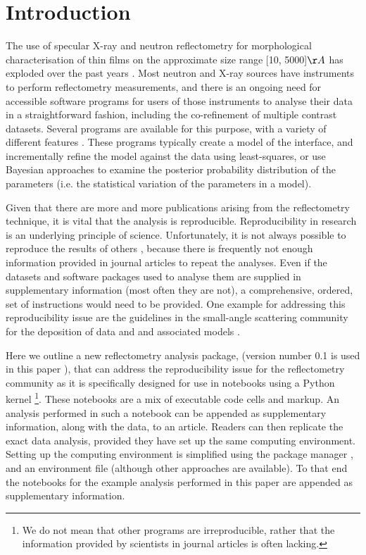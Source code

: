 \documentclass[12pt]{article}
\begin{document}
\section*{Introduction}
The use of specular X-ray and neutron reflectometry for morphological characterisation of thin films on the approximate size range [10, 5000]$\AA$ has exploded over the past years \cite{Wood2017, Daillant2009}. Most neutron and X-ray sources have instruments to perform reflectometry measurements, and there is an ongoing need for accessible software programs for users of those instruments to analyse their data in a straightforward fashion, including the co-refinement of multiple contrast datasets.  Several programs are available for this purpose, with a variety of different features \cite{Bjorck2007, Gerelli2016, Kienzle2011, Nelson2006}. These programs typically create a model of the interface, and incrementally refine the model against the data using least-squares, or use Bayesian approaches \cite{Sivia2006, 2010arXiv1008.4686H} to examine the posterior probability distribution of the parameters (i.e. the statistical variation of the parameters in a model).

Given that there are more and more publications arising from the reflectometry technique, it is vital that the analysis is reproducible. Reproducibility in research is an underlying principle of science. Unfortunately, it is not always possible to reproduce the results of others \cite{Stark2018}, because there is frequently not enough information provided in journal articles to repeat the analyses. Even if the datasets and software packages used to analyse them are supplied in supplementary information (most often they are not), a comprehensive, ordered, set of instructions would need to be provided.
One example for addressing this reproducibility issue are the guidelines in the small-angle scattering community for the deposition of data and and associated models \cite{Trewhella:jc5010}.

Here we outline a new reflectometry analysis package,  (version number 0.1 is used in this paper \cite{refnx}), that can address the reproducibility issue for the reflectometry community as it is specifically designed for use in \Jupyter notebooks \cite{Kluyver:2016aa} using a Python kernel \footnote{We do not mean that other programs are irreproducible, rather that the information provided by scientists in journal articles is often lacking.}.
These notebooks are a mix of executable code cells and markup. An analysis performed in such a notebook can be appended as supplementary information, along with the data, to an article. Readers can then replicate the exact data analysis, provided they have set up the same computing environment. Setting up the computing environment is simplified using the \conda package manager \cite{conda}, and an environment file (although other approaches are available). To that end the \Jupyter notebooks for the example analysis performed in this paper are appended as supplementary information.
\end{document}
